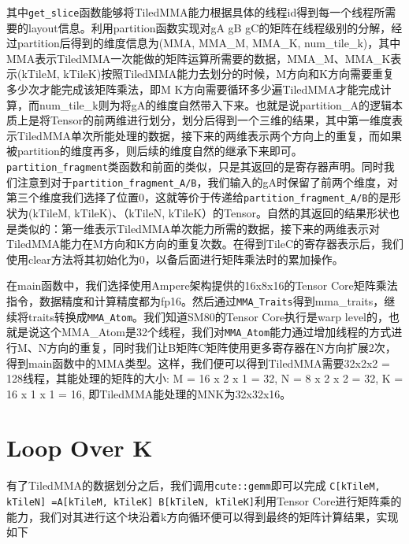 其中\lstinline|get_slice|函数能够将TiledMMA能力根据具体的线程id得到每一个线程所需要的layout信息。利用partition函数实现对gA gB gC的矩阵在线程级别的分解，经过partition后得到的维度信息为(MMA, MMA\_M, MMA\_K, num\_tile\_k)，其中MMA表示TiledMMA一次能做的矩阵运算所需要的数据，MMA\_M、MMA\_K表示(kTileM, kTileK)按照TiledMMA能力去划分的时候，M方向和K方向需要重复多少次才能完成该矩阵乘法，即M K方向需要循环多少遍TiledMMA才能完成计算，而num\_tile\_k则为将gA的维度自然带入下来。也就是说partition\_A的逻辑本质上是将Tensor的前两维进行划分，划分后得到一个三维的结果，其中第一维度表示TiledMMA单次所能处理的数据，接下来的两维表示两个方向上的重复，而如果被partition的维度再多，则后续的维度自然的继承下来即可。\lstinline|partition_fragment|类函数和前面的类似，只是其返回的是寄存器声明。同时我们注意到对于\lstinline|partition_fragment_A/B|，我们输入的gA时保留了前两个维度，对第三个维度我们选择了位置0，这就等价于传递给\lstinline|partition_fragment_A/B|的是形状为(kTileM, kTileK)、（kTileN, kTileK）的Tensor。自然的其返回的结果形状也是类似的：第一维表示TiledMMA单次能力所需的数据，接下来的两维表示对TiledMMA能力在M方向和K方向的重复次数。在得到TileC的寄存器表示后，我们使用clear方法将其初始化为0，以备后面进行矩阵乘法时的累加操作。

在main函数中，我们选择使用Ampere架构提供的16x8x16的Tensor Core矩阵乘法指令，数据精度和计算精度都为fp16。然后通过\lstinline|MMA_Traits|得到mma\_traits，继续将traits转换成\lstinline|MMA_Atom|。我们知道SM80的Tensor Core执行是warp level的，也就是说这个MMA\_Atom是32个线程，我们对\lstinline|MMA_Atom|能力通过增加线程的方式进行M、N方向的重复，同时我们让B矩阵C矩阵使用更多寄存器在N方向扩展2次，得到main函数中的MMA类型。这样，我们便可以得到TiledMMA需要32x2x2 = 128线程，其能处理的矩阵的大小: M = 16 x 2 x 1 = 32, N = 8 x 2 x 2 = 32, K = 16 x 1 x 1 = 16, 即TiledMMA能处理的MNK为32x32x16。

\section{Loop Over K}

有了TiledMMA的数据划分之后，我们调用\lstinline|cute::gemm|即可以完成 \lstinline|C[kTileM, kTileN] =A[kTileM, kTileK] B[kTileN, kTileK]|利用Tensor Core进行矩阵乘的能力，我们对其进行这个块沿着k方向循环便可以得到最终的矩阵计算结果，实现如下

